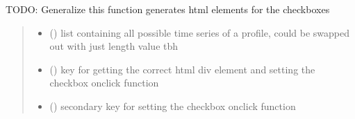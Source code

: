 \documentclass[letterpaper,10pt,english]{sphinxmanual}
\begin{document}

\begin{fulllineitems}
\label{\detokenize{docs_gui/js_api/urbs_editor/supim_editor:populateSupimEditor}}
\pysigstartsignatures
{}
\pysigstopsignatures
\sphinxAtStartPar
TODO: Generalize this function
generates html elements for the checkboxes
\begin{quote}\begin{description}
\begin{itemize}
\item {} 
\sphinxAtStartPar
{} () \textendash{} list containing all possible time series of a profile, could be swapped out with just length value tbh

\item {} 
\sphinxAtStartPar
{} () \textendash{} key for getting the correct html div element and setting the checkbox onclick function

\item {} 
\sphinxAtStartPar
{} () \textendash{} secondary key for setting the checkbox onclick function

\end{itemize}

\end{description}\end{quote}

\end{fulllineitems}

\end{document}
